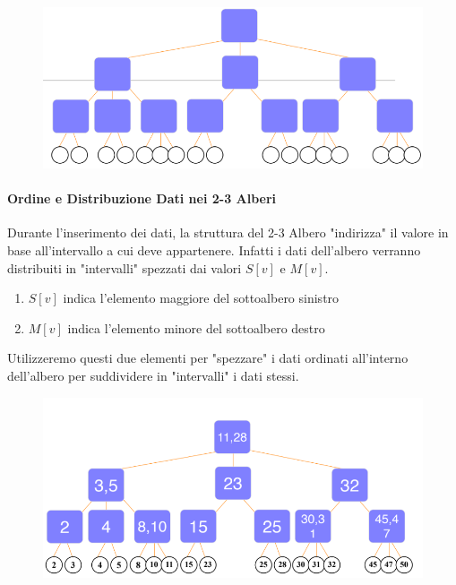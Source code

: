 \documentclass{article}
\begin{document}
\begin{figure}[htbp]
        \center
        \includegraphics[scale=0.4]{img/2-3Alberi.png}
\end{figure}

\newpage

\paragraph{Ordine e Distribuzione Dati nei 2-3 Alberi} Durante l'inserimento dei dati, la struttura del 2-3 Albero "indirizza" il valore in base all'intervallo a cui deve appartenere. Infatti i dati dell'albero verranno distribuiti in "intervalli" spezzati dai valori \(S[v]\) e \(M[v]\).

\begin{enumerate}
    \item $S[v]$ indica l'elemento maggiore del sottoalbero sinistro
    \item $M[v]$ indica l'elemento minore del sottoalbero destro
\end{enumerate}

Utilizzeremo questi due elementi per "spezzare" i dati ordinati all'interno dell'albero per suddividere in "intervalli" i dati stessi.

\begin{figure}[htbp]
        \center
        \includegraphics[scale=0.45]{img/alberi2-3.png}
\end{figure}
\end{document}
